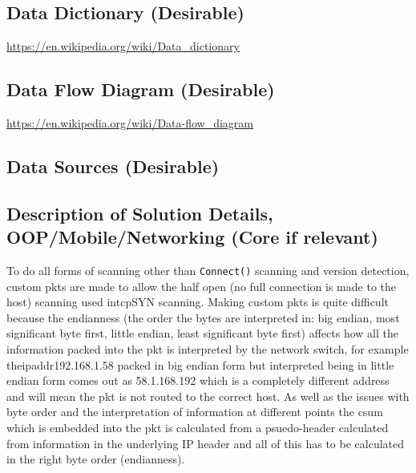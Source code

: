 \documentclass[titlepage]{article}
\let\Oldsubsection\subsection{}
\renewcommand{\subsection}{\FloatBarrier\Oldsubsection}
\begin{document}
\subsection{Data Dictionary (Desirable)}

\textbf{\color{red}{I looked this up and it seemed to be related to database management systems.}}

\href{https://en.wikipedia.org/wiki/Data_dictionary}{https://en.wikipedia.org/wiki/Data\_dictionary}

\subsection{Data Flow Diagram (Desirable)}

\textbf{\color{red}{This seems to be fairly relevant and to do with how data goes through my program
    i.e.\ going from the network to my port scanner into a target object and other scanners
before version detection and finally displaying to the user. Make a flowchart for this.}}

\href{https://en.wikipedia.org/wiki/Data-flow_diagram<Paste>}{https://en.wikipedia.org/wiki/Data-flow\_diagram}

\subsection{Data Sources (Desirable)}

\textbf{\color{red}{Not really sure about this.}}

\subsection{Description of Solution Details, OOP/Mobile/Networking (Core if relevant)}

To do all forms of scanning other than \verb|Connect()| scanning and version detection, custom
\glspl{pkt} are made to allow the \gls{half open} (no full connection is made to the host) scanning
used in\gls{tcp}SYN scanning. Making custom \glspl{pkt} is quite difficult because the endianness
(the order the bytes are interpreted in: big endian, most significant byte first, little endian,
least significant byte first) affects how all the information packed into the \gls{pkt} is interpreted
by the network switch, for example the\gls{ipaddr}192.168.1.58 packed in big endian form but interpreted
being in little endian form comes out as 58.1.168.192 which is a completely different address and
will mean the \gls{pkt} is not routed to the correct host. As well as the issues with byte order
and the interpretation of information at different points the \gls{csum} which is embedded into
the \gls{pkt} is calculated from a psuedo-header calculated from information in the underlying
IP header and all of this has to be calculated in the right byte order (endianness).
\end{document}
